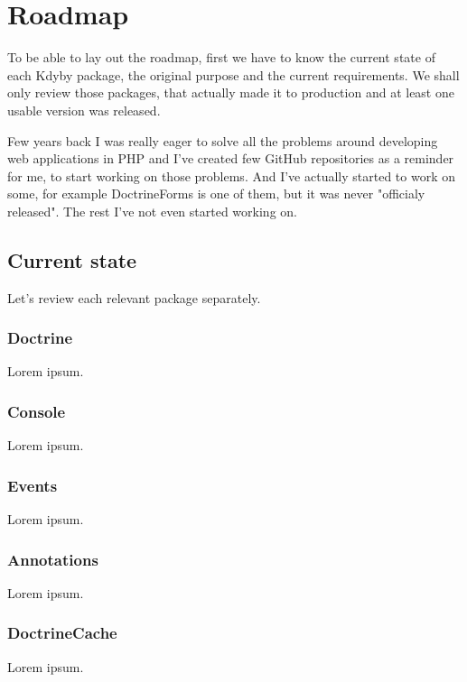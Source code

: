 \chapter{Roadmap}

To be able to lay out the roadmap, first we have to know the current state of each Kdyby package, the original purpose and the current requirements. We shall only review those packages, that actually made it to production and at least one usable version was released.

Few years back I was really eager to solve all the problems around developing web applications in PHP and I've created few GitHub repositories as a reminder for me, to start working on those problems. And I've actually started to work on some, for example DoctrineForms is one of them, but it was never "officialy released". The rest I've not even started working on.

\section{Current state}

Let's review each relevant package separately.

\subsection{Doctrine}

Lorem ipsum.

\subsection{Console}

Lorem ipsum.

\subsection{Events}

Lorem ipsum.

\subsection{Annotations}

Lorem ipsum.

\subsection{DoctrineCache}

Lorem ipsum.


